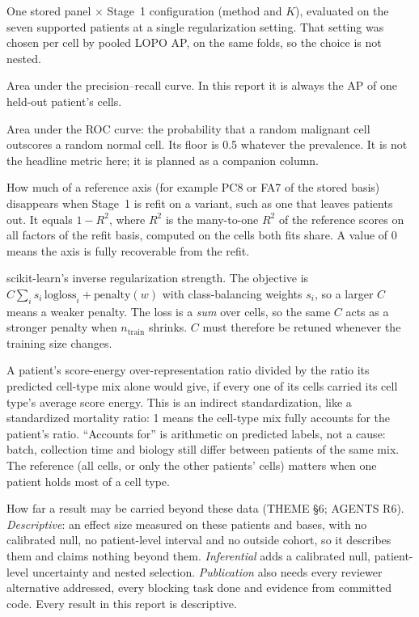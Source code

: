 \begin{description}[leftmargin=0pt,itemsep=3pt,font=\normalfont\bfseries]
\item[Atlas cell.] One stored panel $\times$ Stage~1 configuration (method and $K$), evaluated on the seven supported patients at a single regularization setting. That setting was chosen per cell by pooled LOPO AP, on the same folds, so the choice is not nested.

\item[AUPRC.] Area under the precision--recall curve. In this report it is always the AP of one held-out patient's cells.

\item[AUROC.] Area under the ROC curve: the probability that a random malignant cell outscores a random normal cell. Its floor is 0.5 whatever the prevalence. It is not the headline metric here; it is planned as a companion column.

\item[Axis loss.] How much of a reference axis (for example PC8 or FA7 of the stored basis) disappears when Stage~1 is refit on a variant, such as one that leaves patients out. It equals $1-R^2$, where $R^2$ is the many-to-one $R^2$ of the reference scores on all factors of the refit basis, computed on the cells both fits share. A value of 0 means the axis is fully recoverable from the refit.

\item[$C$.] scikit-learn's inverse regularization strength. The objective is $C\sum_i s_i\,\mathrm{logloss}_i+\mathrm{penalty}(w)$ with class-balancing weights $s_i$, so a larger $C$ means a weaker penalty. The loss is a \emph{sum} over cells, so the same $C$ acts as a stronger penalty when $n_{\text{train}}$ shrinks. $C$ must therefore be retuned whenever the training size changes.

\item[Cell-type-adjusted ratio.] A patient's score-energy over-representation ratio divided by the ratio its predicted cell-type mix alone would give, if every one of its cells carried its cell type's average score energy. This is an indirect standardization, like a standardized mortality ratio: 1 means the cell-type mix fully accounts for the patient's ratio. ``Accounts for'' is arithmetic on predicted labels, not a cause: batch, collection time and biology still differ between patients of the same mix. The reference (all cells, or only the other patients' cells) matters when one patient holds most of a cell type.

\item[Claim levels (descriptive, inferential, publication).] How far a result may be carried beyond these data (THEME \S6; AGENTS R6). \emph{Descriptive}: an effect size measured on these patients and bases, with no calibrated null, no patient-level interval and no outside cohort, so it describes them and claims nothing beyond them. \emph{Inferential} adds a calibrated null, patient-level uncertainty and nested selection. \emph{Publication} also needs every reviewer alternative addressed, every blocking task done and evidence from committed code. Every result in this report is descriptive.


\end{description}

